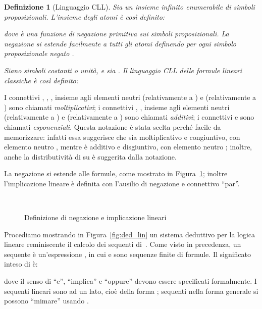 \documentclass[12pt,a4paper,openright,twoside]{report}
\newtheorem{dfn}[thm]{Definizione}
\begin{document}
\begin{dfn}[Linguaggio \textsf{CLL}] Sia  un insieme infinito enumerabile di \emph{simboli proposizionali}. L'insieme degli \emph{atomi}  \`e cos\`i definito:

dove  \`e una \emph{funzione di negazione primitiva sui simboli proposizionali}. La negazione si estende facilmente a tutti gli atomi definendo  per ogni simbolo proposizionale negato .

Siano  simboli costanti o \emph{unit\`a}, e sia . Il \emph{linguaggio \textsf{CLL} delle formule lineari classiche} \`e cos\`i definito:

\end{dfn}
I connettivi , , , insieme agli elementi neutri  (relativamente a ) e  (relativamente a ) sono chiamati \emph{moltiplicativi}; i connettivi , , insieme agli elementi neutri  (relativamente a ) e  (relativamente a ) sono chiamati \emph{additivi}; i connettivi  e  sono chiamati \emph{esponenziali}. Questa notazione \`e stata scelta perch\'e facile da memorizzare: infatti essa suggerisce che  sia moltiplicativo e congiuntivo, con elemento neutro , mentre  \`e additivo e disgiuntivo, con elemento neutro ; inoltre, anche la distributivit\`a di  su  \`e suggerita dalla notazione.

La negazione si estende alle formule, come mostrato in Figura~\ref{fig:eq_lin}; inoltre l'implicazione lineare \`e definita con l'ausilio di negazione e connettivo ``par''.

\begin{figure}

~\\
\centering
\caption{Definizione di negazione e implicazione lineari}
\label{fig:eq_lin}
\end{figure}

Procediamo mostrando in Figura~\ref{fig:ded_lin} un sistema deduttivo per la logica lineare reminiscente il calcolo dei sequenti di~\cite{Gen35}. Come visto in precedenza, un sequente \`e un'espressione , in cui  e  sono sequenze finite di formule. Il significato inteso di  \`e:

dove il senso di ``e'', ``implica'' e ``oppure'' devono essere specificati formalmente. I sequenti lineari sono ad un lato, cio\`e della forma ; sequenti nella forma generale  si possono ``mimare'' usando .
\end{document}
